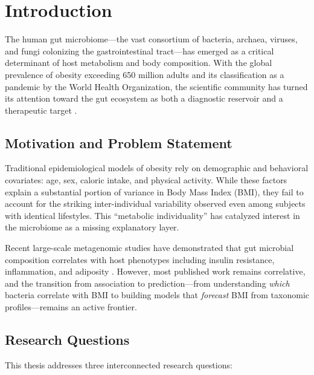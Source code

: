 
\chapter{Introduction}
\label{ch:introduction}

The human gut microbiome---the vast consortium of bacteria, archaea, viruses, and fungi colonizing the gastrointestinal tract---has emerged as a critical determinant of host metabolism and body composition. With the global prevalence of obesity exceeding 650 million adults and its classification as a pandemic by the World Health Organization, the scientific community has turned its attention toward the gut ecosystem as both a diagnostic reservoir and a therapeutic target \cite{who2021obesity}.

\section{Motivation and Problem Statement}

Traditional epidemiological models of obesity rely on demographic and behavioral covariates: age, sex, caloric intake, and physical activity. While these factors explain a substantial portion of variance in Body Mass Index (BMI), they fail to account for the striking inter-individual variability observed even among subjects with identical lifestyles. This ``metabolic individuality'' has catalyzed interest in the microbiome as a missing explanatory layer.

Recent large-scale metagenomic studies have demonstrated that gut microbial composition correlates with host phenotypes including insulin resistance, inflammation, and adiposity \cite{turnbaugh2006obesity}. However, most published work remains correlative, and the transition from association to prediction---from understanding \emph{which} bacteria correlate with BMI to building models that \emph{forecast} BMI from taxonomic profiles---remains an active frontier.

\section{Research Questions}

This thesis addresses three interconnected research questions:


